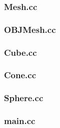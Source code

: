 \documentclass[a4paper,12pt]{article}
\begin{document}
\subsubsection*{Mesh.cc}

\newpage

\subsubsection*{OBJMesh.cc}

\newpage

\subsubsection*{Cube.cc}

\newpage

\subsubsection*{Cone.cc}

\newpage

\subsubsection*{Sphere.cc}

\newpage

\subsubsection*{main.cc}

\newpage
\end{document}
